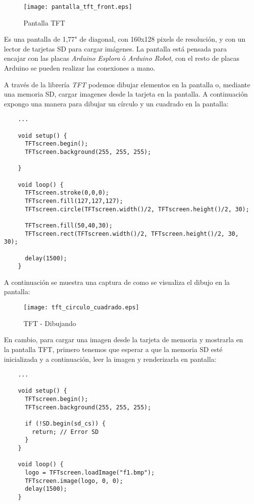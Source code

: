 \begin{figure}[h!]
    \centering
    \texttt{[image: pantalla\_tft\_front.eps]}
    \caption{Pantalla TFT}\label{fig:arduino-tft-front}
\end{figure}



Es una pantalla de 1,77" de diagonal, con 160x128 pixels de resolución, y con un lector de tarjetas SD para cargar imágenes. La pantalla está pensada para encajar con las placas \emph{Arduino Esplora} ó \emph{Arduino Robot}, con el resto de placas Arduino se pueden realizar las conexiones a mano.

A través de la librería \emph{TFT} podemos dibujar elementos en la pantalla o, mediante una memoria SD, cargar imagenes desde la tarjeta en la pantalla. A continuación expongo una manera para dibujar un círculo y un cuadrado en la pantalla:

\begin{lstlisting}
    ...

    void setup() {
      TFTscreen.begin();
      TFTscreen.background(255, 255, 255);

    }

    void loop() {
      TFTscreen.stroke(0,0,0);
      TFTscreen.fill(127,127,127);
      TFTscreen.circle(TFTscreen.width()/2, TFTscreen.height()/2, 30);

      TFTscreen.fill(50,40,30);
      TFTscreen.rect(TFTscreen.width()/2, TFTscreen.height()/2, 30, 30);

      delay(1500);
    }
\end{lstlisting}

A continuación se muestra una captura de como se visualiza el dibujo en la pantalla:

\begin{figure}[h!]
    \centering
    \texttt{[image: tft\_circulo\_cuadrado.eps]}
    \caption{TFT - Dibujando}\label{fig:tft_circulo_cuadrado}
\end{figure}

En cambio, para cargar una imagen desde la tarjeta de memoria y mostrarla en la pantalla TFT, primero tenemos que esperar a que la memoria SD esté inicializada y a continuación, leer la imagen y renderizarla en pantalla:

\begin{lstlisting}
    ...

    void setup() {
      TFTscreen.begin();
      TFTscreen.background(255, 255, 255);

      if (!SD.begin(sd_cs)) {
        return; // Error SD
      }
    }

    void loop() {
      logo = TFTscreen.loadImage("f1.bmp");
      TFTscreen.image(logo, 0, 0);
      delay(1500);
    }
\end{lstlisting}

